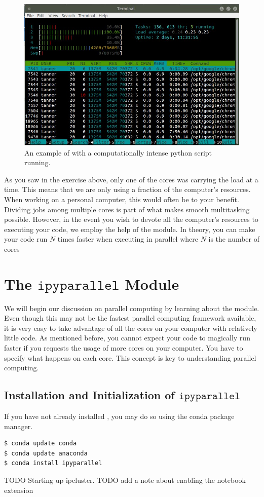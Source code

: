 \begin{figure}
    \includegraphics[width=\textwidth]{active.jpg}
\caption{An example of  with a computationally intense python script running.}
\label{fig:htop}
\end{figure}

As you saw in the exercise above, only one of the cores was carrying the load at a time. This means that we are only using a fraction of the computer's resources. When working on a personal computer, this would often be to your benefit. Dividing jobs among multiple cores is part of what makes smooth multitasking possible. However, in the event you wish to devote all the computer's resources to executing your code, we employ the help of the  module. In theory, you can make your code run $N$ times faster when executing in parallel where $N$ is the number of cores

\section*{The $\texttt{ipyparallel}$ Module}
We will begin our discussion on parallel computing by learning about the  module. Even though this may not be the fastest parallel computing framework available, it is very easy to take advantage of all the cores on your computer with relatively little code. As mentioned before, you cannot expect your code to magically run faster if you requests the usage of more cores on your computer. You have to specify what happens on each core. This concept is key to understanding parallel computing.

\subsection*{Installation and Initialization of $\texttt{ipyparallel}$}

If you have not already installed , you may do so using the conda package manager.

\begin{lstlisting}
$ conda update conda
$ conda update anaconda
$ conda install ipyparallel
\end{lstlisting}

TODO Starting up ipcluster.
TODO add a note about enabling the notebook extension
